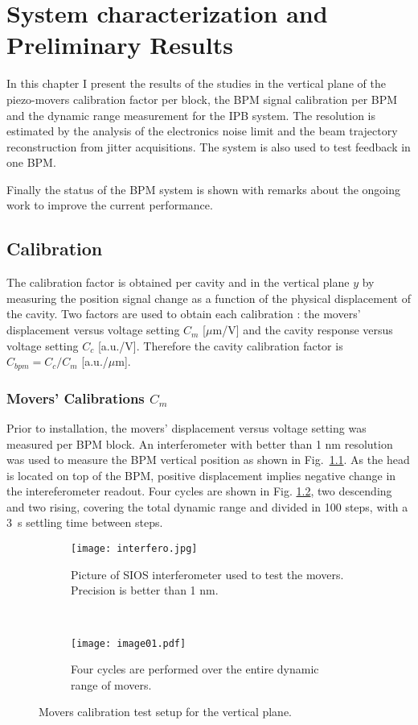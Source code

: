 \chapter{System characterization and Preliminary Results}
In this chapter I present the results of the studies in the vertical plane of the piezo-movers calibration factor per block, the BPM signal calibration per BPM and the dynamic range measurement for the IPB system. The resolution is estimated by the analysis of the electronics noise limit and the beam trajectory reconstruction from jitter acquisitions. The system is also used to test feedback in one BPM.\par
Finally the status of the BPM system is shown with remarks about the ongoing work to improve the current performance.\par
\section{Calibration}\label{s:cals}
The calibration factor is obtained per cavity and in the vertical plane $y$ by measuring the position signal change as a function of the physical displacement of the cavity. Two factors are used to obtain each calibration : the movers' displacement versus voltage setting $C_m$ [$\mu$m/V] and the cavity response versus voltage setting $C_c$ [a.u./V]. Therefore the cavity calibration factor is $C_{bpm}=C_c/C_m$ [a.u./$\mu$m].\par
\subsection{Movers' Calibrations $C_m$}\label{s:calcm}
Prior to installation, the movers' displacement versus voltage setting was measured per BPM block. An interferometer with better than 1 nm resolution was used to measure the BPM vertical position as shown in Fig.~\ref{f:interfero}. As the head is located on top of the BPM, positive displacement implies negative change in the intereferometer readout. Four cycles are shown in Fig. \ref{f:fourcycles}, two descending and two rising, covering the total dynamic range and divided in 100 steps, with a 3~s settling time between steps.\par
\begin{figure}[!htb]
\centering
\begin{subfigure}[b]{0.9\textwidth}
\centering
\texttt{[image: interfero.jpg]}\caption{Picture of SIOS interferometer used to test the movers. Precision is better than 1 nm.}\label{f:interfero}
\end{subfigure}\\%
\begin{subfigure}[b]{0.9\textwidth}
\centering
\texttt{[image: image01.pdf]}\caption{Four cycles are performed over the entire dynamic range of movers.}\label{f:fourcycles}
\end{subfigure}\caption{Movers calibration test setup for the vertical plane.}\label{f:cmtest}
\end{figure}
